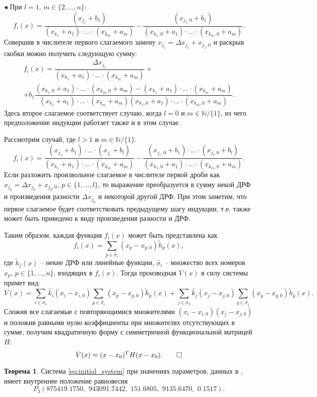\documentclass[12pt,a4paper]{extarticle}
\renewenvironment{proof}{\noindent$\blacktriangleleft$}{}
\theoremstyle{definition}
\newtheorem{theorem}{Теорема}
\theoremstyle{definition}
\theoremstyle{definition}
\begin{document}
\begin{proof}
		При $l=1$, $m\in\{2,\dots,n\}$:
		\[f_i(x)=\dfrac{(x_{j_1}+b_1)}{(x_{k_1}+a_1)\cdot...\cdot(x_{k_m}+a_m)}-\dfrac{(x_{j_1,0}+b_1)}{(x_{k_1,0}+a_1)\cdot...\cdot(x_{k_m,0}+a_m)}.\]
		Совершив в числителе первого слагаемого замену $x_{j_1}=\Delta x_{j_1} + x_{j_1,0}$ и раскрыв скобки можно получить следующую сумму:
		\begin{multline*}
			f_i(x)=\dfrac{\Delta x_{j_1}}{(x_{k_1}+a_1)\cdot...\cdot(x_{k_m}+a_m)}+\\
			+b_1\dfrac{(x_{k_1,0}+a_1)\cdot...\cdot(x_{k_m,0}+a_m)-(x_{k_1}+a_1)\cdot...\cdot(x_{k_m}+a_m)}{(x_{k_1}+a_1)\cdot...\cdot(x_{k_m}+a_m)(x_{k_1,0}+a_1)\cdot...\cdot(x_{k_m,0}+a_m)}.
		\end{multline*}
		Здесь второе слагаемое соответствует случаю, когда $l=0$ и $m\in\mathbb{N}/\{1\}$, из чего предположение индукции работает также и в этом случае. 
		
		Рассмотрим случай, где $l > 1$ и $m\in\mathbb{N}/\{1\}$.
		\[f_i(x)=\dfrac{(x_{j_1}+b_1)\cdot...\cdot(x_{j_l}+b_l)}{(x_{k_1}+a_1)\cdot...\cdot(x_{k_m}+a_m)}-\dfrac{(x_{j_1,0}+b_1)\cdot...\cdot(x_{j_l,0}+b_l)}{(x_{k_1,0}+a_1)\cdot...\cdot(x_{k_m,0}+a_m)}.\]
		Если разложить произвольное слагаемое в числителе первой дроби как $x_{j_p}=\Delta x_{j_p} + x_{j_p,0},\, p\in\{1,\dots,l\}$, то выражение преобразуется в сумму некой ДРФ и произведения разности $\Delta x_{j_p}$ и некоторой другой ДРФ. При этом заметим, что первое слагаемое будет соответствовать предыдущему шагу индукции, т.е. также может быть приведено к виду произведения разности и ДРФ.
		
		Таким образом, каждая функция $f_i(x)$ может быть представлена как
		\[f_i(x)=\sum\limits_{p\in\hat{\sigma}_i}(x_p-x_{p,0})\tilde{h}_p(x),\]    
		где $\tilde{h}_j(x)$ -- некие ДРФ или линейные функции, $\hat{\sigma}_i$ -- множество всех номеров $x_p,\, p\in\{1,\dots,n\}$, входящих в $f_i(x)$. Тогда производная $V(x)$ в силу системы примет вид:
		\[\dot{V}(x)=\sum\limits_{i\in\sigma_1}\hat{k}_i(x_i-x_{i,0})\sum\limits_{p\in\hat{\sigma}_i}(x_p-x_{p,0})\tilde{h}_{p}(x)+\sum\limits_{j\in\sigma_2}\hat{k}_j(x_j-x_{j,0})\sum\limits_{q\in\hat{\sigma}_j}(x_q-x_{q,0})\tilde{h}_{q}(x).\]
		Сложив все слагаемые с повторяющимися множителями $(x_i-x_{i,0})(x_j-x_{j,0})$ и положив равными нулю коэффициенты при множителях отсутствующих в сумме, получим квадратичную форму с симметричной функциональной матрицей $H$:
		\[\dot{V}(x)=(x-x_0)^{T}H(x-x_0).\qed\]
	\end{proof}
	
	\begin{theorem}
		Система \ref{eq:initial_system} при значениях параметров, данных в \cite{model}, имеет внутреннее положение равновесия
		\[P_3\left(875419.1750,\,\,943091.7442,\,\,151.6805,\,\,9135.6470,\,\,0.1517\right).\] 
	\end{theorem}
	
\end{document}
